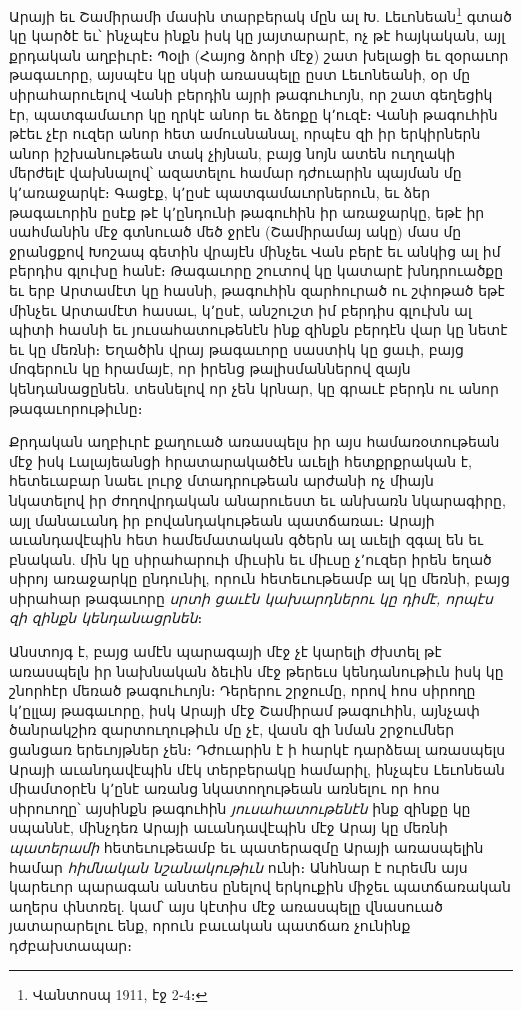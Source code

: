 \documentclass{article}
\begin{document}
{Արայի եւ Շամիրամի մասին տարբերակ մըն ալ Խ. Լեւոնեան\footnote{Վանտոսպ 1911, էջ 2֊4։} գտած կը կարծէ եւ՝ ինչպէս ինքն իսկ կը յայտարարէ, ոչ թէ հայկական, այլ քրդական աղբիւրէ։ Պօլի (Հայոց ձորի մէջ) շատ խելացի եւ զօրաւոր թագաւորը, այսպէս կը սկսի առասպելը ըստ Լեւոնեանի, օր մը սիրահարուելով Վանի բերդին այրի թագուհւոյն, որ շատ գեղեցիկ էր, պատգամաւոր կը ղրկէ անոր եւ ձեոքը կ՚ուզէ։ Վանի թագուհին թէեւ չէր ուզեր անոր հետ ամուսնանալ, որպէս զի իր երկիրներն անոր իշխանութեան տակ չիյնան, բայց նոյն ատեն ուղղակի մերժելէ վախնալով՝ ազատելու համար դժուարին պայման մը կ՚առաջարկէ։ Գացէք, կ՚ըսէ պատգամաւորներուն, եւ ձեր թագաւորին ըսէք թէ կ՚ընդունի թագուհին իր առաջարկը, եթէ իր սահմանին մէջ գտնուած մեծ ջրէն (Շամիրամայ ակը) մաս մը ջրանցքով Խոշապ գետին վրայէն մինչեւ Վան բերէ եւ անկից ալ իմ բերդիս գլուխը հանէ։ Թագաւորը շուտով կը կատարէ խնդրուածքը եւ երբ Արտամէտ կը հասնի, թագուհին զարհուրած ու շփոթած եթէ մինչեւ Արտամէտ հասաւ, կ՚ըսէ, անշուշտ իմ բերդիս գլուխն ալ պիտի հասնի եւ յուսահատութենէն ինք զինքն բերդէն վար կը նետէ եւ կը մեռնի։ Եղածին վրայ թագաւորը սաստիկ կը ցաւի, բայց մոգերուն կը հրամայէ, որ իրենց թալիսմաններով զայն կենդանացընեն. տեսնելով որ չեն կրնար, կը գրաւէ բերդն ու անոր թագաւորութիւնը։

Քրդական աղբիւրէ քաղուած առասպելս իր այս համառօտութեան մէջ իսկ Լալայեանցի հրատարակածէն աւելի հետքրքրական է, հետեւաբար նաեւ լուրջ մտադրութեան արժանի ոչ միայն նկատելով իր ժողովրդական անարուեստ եւ անխառն նկարագիրը, այլ մանաւանդ իր բովանդակութեան պատճառաւ։ Արայի աւանդավէպին հետ համեմատական գծերն ալ աւելի զգալ են եւ բնական. մին կը սիրահարուի միւսին եւ միւսը չ՚ուզեր իրեն եղած սիրոյ առաջարկը ընդունիլ, որուն հետեւութեամբ ալ կը մեռնի, բայց սիրահար թագաւորը \emph{սրտի ցաւէն կախարդներու կը դիմէ, որպէս զի զինքն կենդանացրնեն}։

Անստոյգ է, բայց ամէն պարագայի մէջ չէ կարելի ժխտել թէ առասպելն իր նախնական ձեւին մէջ թերեւս կենդանութիւն իսկ կը շնորհէր մեռած թագուհւոյն։ Դերերու շրջումը, որով հոս սիրողը կ՚ըլլայ թագաւորը, իսկ Արայի մէջ Շամիրամ թագուհին, այնչափ ծանրակշիռ զարտուղութիւն մը չէ, վասն զի նման շրջումներ ցանցառ երեւոյթներ չեն։ Դժուարին է ի հարկէ դարձեալ առասպելս Արայի աւանդավէպին մէկ տերբերակը համարիլ, ինչպէս Լեւոնեան միամտօրէն կ՚ընէ առանց նկատողութեան առնելու որ հոս սիրուողը՝ այսինքն թագուհին \emph{յուսահատութենէն} ինք զինքը կը սպաննէ, մինչդեռ Արայի աւանդավէպին մէջ Արայ կը մեռնի \emph{պատերամի} հետեւութեամբ եւ պատերազմը Արայի առասպելին համար \emph{հիմնական նշանակութիւն} ունի։ Անհնար է ուրեմն այս կարեւոր պարագան անտես ընելով երկուքին միջեւ պատճառական աղերս փնտռել. կամ՝ այս կէտիս մէջ առասպելը վնասուած յատարարելու ենք, որուն բաւական պատճառ չունինք դժբախտապար։

}
\end{document}
